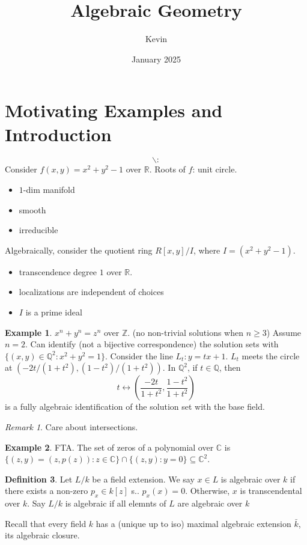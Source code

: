 \documentclass{article}
\title{Algebraic Geometry}
\author{Kevin}
\date{January 2025}
\theoremstyle{definition}
\newtheorem{defn}{Definition}[section]
\newtheorem{example}[defn]{Example}
\theoremstyle{remark}
\newtheorem{rem}{Remark}
\theoremstyle{plain}
\newcommand{\ZZ}{\mathbb{Z}}
\newcommand{\QQ}{\mathbb{Q}}
\newcommand{\RR}{\mathbb{R}}
\newcommand{\CC}{\mathbb{C}}
\begin{document}
\maketitle
\section{Motivating Examples and Introduction}
\[\backslash:\tag{Owen's signature}\]
Consider $f(x,y)=x^2+y^2-1$ over $\RR$. Roots of $f$: unit circle.
\begin{itemize}
    \item $1$-dim manifold
    \item smooth
    \item irreducible
\end{itemize}
Algebraically, consider the quotient ring $R[x,y]/I$, where $I=(x^2+y^2-1)$.
\begin{itemize}
    \item transcendence degree $1$ over $\RR$.
    \item localizations are independent of choices
    \item $I$ is a prime ideal
\end{itemize}
\begin{example}
    $x^n+y^n=z^n$ over $\ZZ$. (no non-trivial solutions when $n\ge 3$) Assume $n=2$. Can identify (not a bijective correspondence) the solution sets with $\{(x,y)\in\QQ^2:x^2+y^2=1\}$. Consider the line $L_t:y=tx+1$. $L_t$ meets the circle at $(-2t/(1+t^2),(1-t^2)/(1+t^2))$. In $\QQ^2$, if $t\in \QQ$, then 
    \[t\leftrightarrow\left(\dfrac{-2t}{1+t^2},\dfrac{1-t^2}{1+t^2}\right)\]
    is a fully algebraic identification of the solution set with the base field.
\end{example}
\begin{rem}
    Care about intersections.
\end{rem}
\begin{example}
    FTA. The set of zeros of a polynomial over $\CC$ is $\{(z,y)=(z,p(z)):z\in\CC\}\cap\{(z,y):y=0\}\subseteq\CC^2$.
\end{example}
\begin{defn}
    Let $L/k$ be a field extension. We say $x\in L$ is algebraic over $k$ if there exists a non-zero $p_x\in k[z]$ s.. $p_x(x)=0$. Otherwise, $x$ is transcendental over $k$. Say $L/k$ is algebraic if all elemnts of $L$ are algebraic over $k$
\end{defn}
Recall that every field $k$ has a (unique up to iso) maximal algebraic extension $\bar k$, its algebraic closure.
\end{document}
